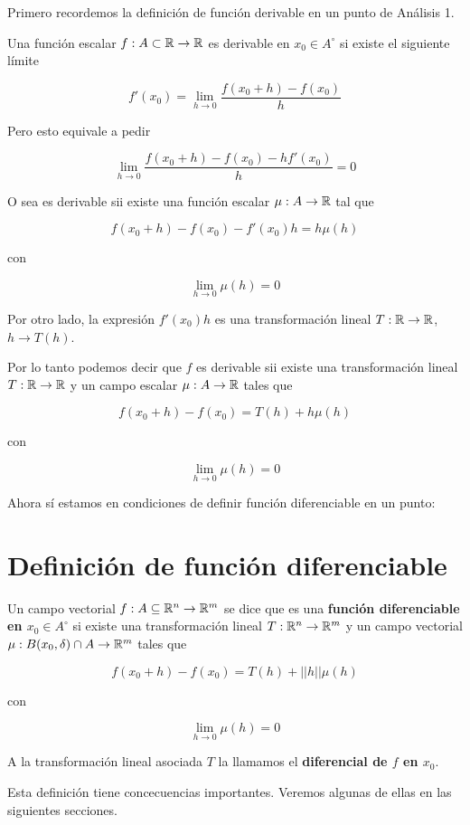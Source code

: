 Primero recordemos la definición de función derivable en un punto de Análisis 1.

\begin{definition}
Una función escalar $ f : A \subset \mathbb{R} \to \mathbb{R}$ es derivable en $ x_0 \in A^{\circ}$ si existe el siguiente límite

$$ f'(x_0) = \lim_{h \to 0} \frac{f(x_0 + h) - f(x_0)}{h} $$
\end{definition}

Pero esto equivale a pedir

$$ \lim_{h \to 0} \frac{f(x_0 + h) - f(x_0) - h f'(x_0)}{h} = 0 $$

O sea es derivable sii existe una función escalar $ \mu : A \to \mathbb{R}$ tal que

$$ f(x_0 + h) - f(x_0) - f'(x_0) h = h \mu(h) $$

con 

$$ \lim_{h \to 0} \mu(h) = 0$$

Por otro lado, la expresión $ f'(x_0) h$ es una transformación lineal $T : \mathbb{R} \to \mathbb{R}$, $h \to T(h)$.

Por lo tanto podemos decir que $f$ es derivable sii existe una transformación lineal $T : \mathbb{R} \to \mathbb{R}$ y un campo escalar $ \mu : A \to \mathbb{R}$ tales que

$$ f(x_0 + h) - f(x_0) = T(h) + h \mu(h)$$

con 

$$ \lim_{h \to 0} \mu(h) = 0$$

Ahora sí estamos en condiciones de definir función diferenciable en un punto:

\section{Definición de función diferenciable}

\begin{definition}[Diferenciabilidad]
Un campo vectorial $ f : A \subseteq \mathbb{R}^n \to \mathbb{R}^m$ se dice que es una \textbf{función diferenciable en $ x_0 \in A^{\circ} $}  si existe una transformación lineal $ T : \mathbb{R}^n \to \mathbb{R}^m$ y un campo vectorial $ \mu : B(x_0, \delta) \cap A \to \mathbb{R}^m$ tales que

$$ f(x_0 + h) - f(x_0) = T(h) + ||h|| \mu(h) $$

con 

$$  \lim_{h \to 0} \mu(h) = 0 $$

A la transformación lineal asociada $T$ la llamamos el \textbf{diferencial de $f$ en $x_0$}.

\end{definition}
Esta definición tiene concecuencias importantes.  Veremos algunas de ellas en las siguientes secciones.

